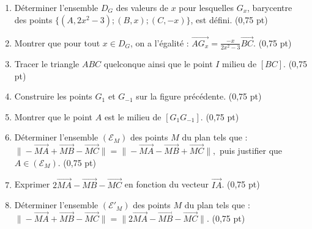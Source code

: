 \documentclass[12pt,a4paper]{article}
\begin{document}
\begin{enumerate}
    \item Déterminer l’ensemble $D_G$ des valeurs de $x$ pour lesquelles $G_x$, barycentre\\ des points $\{(A, 2x^2 - 3); (B, x); (C, -x)\}$, est défini. \hfill (0,75 pt)

    \item Montrer que pour tout $x \in D_G$, on a l’égalité :
    \(
    \overrightarrow{AG_x} = \frac{-x}{2x^2 - 3} \overrightarrow{BC}.
    \) \hfill (0,75 pt)

    \item Tracer le triangle $ABC$ quelconque ainsi que le point $I$ milieu de $[BC]$. \hfill (0,75 pt)

    \item Construire les points $G_1$ et $G_{-1}$ sur la figure précédente. \hfill (0,75 pt)

    \item Montrer que le point $A$ est le milieu de $[G_1G_{-1}]$. \hfill (0,75 pt)

    \item Déterminer l’ensemble $(\mathscr{E}_M)$ des points $M$ du plan tels que :\\
    \(
    \|-\overrightarrow{MA} + \overrightarrow{MB} - \overrightarrow{MC}\| = \|-\overrightarrow{MA} - \overrightarrow{MB} + \overrightarrow{MC}\|,
    \)
    puis justifier que $A \in (\mathscr{E}_M)$. \hfill (0,75 pt)

    \item Exprimer $2\overrightarrow{MA} - \overrightarrow{MB} - \overrightarrow{MC}$ en fonction du vecteur $\overrightarrow{IA}$. \hfill (0,75 pt)

    \item Déterminer l’ensemble $(\mathscr{E}'_M)$ des points $M$ du plan tels que :\\
    \(
    \|-\overrightarrow{MA} + \overrightarrow{MB} - \overrightarrow{MC}\| = \|2\overrightarrow{MA} - \overrightarrow{MB} - \overrightarrow{MC}\|.
    \) \hfill (0,75 pt)
\end{enumerate}
\end{document}
